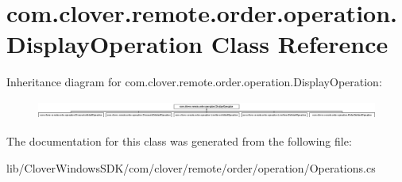 \hypertarget{classcom_1_1clover_1_1remote_1_1order_1_1operation_1_1_display_operation}{}\section{com.\+clover.\+remote.\+order.\+operation.\+Display\+Operation Class Reference}
\label{classcom_1_1clover_1_1remote_1_1order_1_1operation_1_1_display_operation}
Inheritance diagram for com.\+clover.\+remote.\+order.\+operation.\+Display\+Operation\+:\begin{figure}[H]
\begin{center}
\leavevmode
\includegraphics[height=0.597333cm]{classcom_1_1clover_1_1remote_1_1order_1_1operation_1_1_display_operation}
\end{center}
\end{figure}


The documentation for this class was generated from the following file\+:\begin{DoxyCompactItemize}
\item 
lib/\+Clover\+Windows\+S\+D\+K/com/clover/remote/order/operation/Operations.\+cs\end{DoxyCompactItemize}
